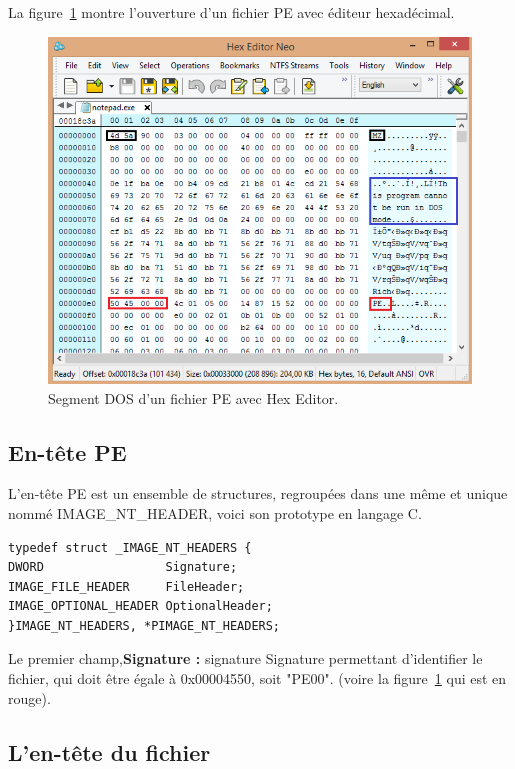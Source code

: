La figure~\ref{fig :pic2} montre l'ouverture d'un fichier PE avec éditeur hexadécimal.
\begin{figure}[H]
\begin{center}
\includegraphics[scale=0.8]{Figures/pic2.PNG}
\caption{ Segment DOS d'un fichier PE avec Hex Editor.}
\label{fig :pic2} 
\end{center}
\end{figure}
\subsection{En-tête PE}
L'en-tête PE est un ensemble de structures, regroupées dans une même et unique nommé IMAGE\_NT\_HEADER,
voici son prototype en langage C.
\begin{lstlisting}
typedef struct _IMAGE_NT_HEADERS {
DWORD                 Signature;
IMAGE_FILE_HEADER     FileHeader;
IMAGE_OPTIONAL_HEADER OptionalHeader;
}IMAGE_NT_HEADERS, *PIMAGE_NT_HEADERS;
\end{lstlisting}


Le premier champ,\textbf{Signature : }signature Signature permettant d'identifier le fichier, qui doit être égale à 0x00004550, soit "PE00". (voire la figure~\ref{fig :pic2} qui est en rouge).
\\
\subsection{L'en-tête du fichier}

